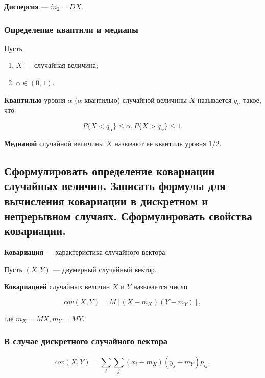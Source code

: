 \textbf{Дисперсия} --- $\dot m_{2} = DX$.

\subsubsection*{Определение квантили и медианы}

Пусть

\begin{enumerate}
	\item $X$ --- случайная величина;
	\item $\alpha \in (0, 1)$.
\end{enumerate}

\textbf{Квантилью} уровня $\alpha$ ($\alpha$-квантилью) случайной величины $X$ называется $q_{\alpha}$ такое, что

\begin{equation}
	P\{X < q_{\alpha}\} \leqslant \alpha, P \{X > q_{\alpha}\} \leqslant 1.
\end{equation}

\textbf{Медианой} случайной величины $X$ называют ее квантиль уровня $1/2$.

\subsection{Сформулировать определение ковариации случайных величин. Записать формулы для вычисления ковариации в дискретном и непрерывном случаях. Сформулировать свойства ковариации.}

\textbf{Ковариация} --- характеристика случайного вектора.

Пусть $(X, Y)$ --- двумерный случайный вектор.

\textbf{Ковариацией} случайных величин $X$ и $Y$ называется число

\begin{equation}
	cov(X, Y) = M[(X - m_{X})(Y - m_{Y})],
\end{equation}

где $m_{X} = MX, m_{Y} = MY$.

\subsubsection*{В случае дискретного случайного вектора}

\begin{equation}
	cov(X, Y) =  \sum_{i}^{} \sum_{j}^{} (x_{i} - m_{X})(y_{j} - m_{Y})p_{ij},
\end{equation}

